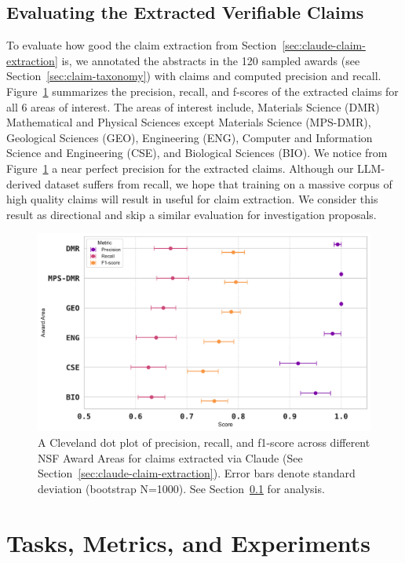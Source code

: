 \documentclass[11pt]{article}
\begin{document}
\subsection{Evaluating the Extracted Verifiable Claims}
\label{sec:eval-claude-claims}
To evaluate how good the claim extraction from Section~\ref{sec:claude-claim-extraction} is, we annotated the abstracts in the 120 sampled awards (see Section~\ref{sec:claim-taxonomy}) with claims and computed precision and recall. Figure~\ref{fig:syndata_eval} summarizes the precision, recall, and f-scores of the extracted claims for all 6 areas of interest. The areas of interest include, Materials Science (DMR) Mathematical and Physical Sciences except Materials Science (MPS-DMR), Geological Sciences (GEO), Engineering (ENG), Computer and Information Science and Engineering (CSE), and Biological Sciences (BIO). We notice from Figure~\ref{fig:syndata_eval} a near perfect precision for the extracted claims. Although our LLM-derived dataset suffers from recall, we hope that training on a massive corpus of high quality claims will result in useful for claim extraction. We consider this result as directional and skip a similar evaluation for investigation proposals.
\begin{figure}[t!]
    \centering
    \includegraphics[width=1\linewidth]{images/syndata_eval.pdf}
    \caption{A Cleveland dot plot of precision, recall, and f1-score across different NSF Award Areas for claims extracted via Claude (See Section~\ref{sec:claude-claim-extraction}). Error bars denote standard deviation (bootstrap N=1000). See Section~\ref{sec:eval-claude-claims} for analysis.}
    \label{fig:syndata_eval}
\end{figure}
\section{Tasks, Metrics, and Experiments}
\label{sec:tasks-metrics-experiments}
\end{document}
